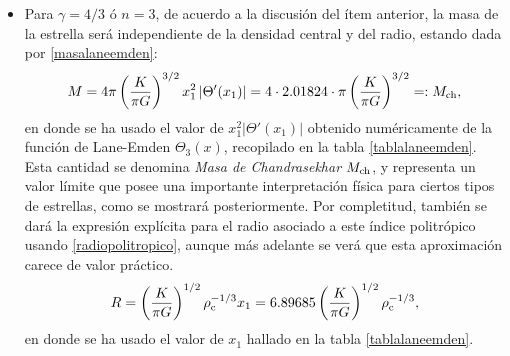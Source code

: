 \begin{itemize}
 \item Para $\gamma=4/3$ ó $n=3$, de acuerdo a la discusión del ítem anterior, la masa de la estrella será independiente de la densidad central y del radio, estando dada por \eqref{masalaneemden}:
\begin{align}\label{masa4/3}
 M=4\pi\left(\frac{K}{\pi G}\right)^{3/2}x_1^2\left|\Theta'(x_1)\right|
 =4\cdot2.01824\cdot\pi\left(\frac{K}{\pi G}\right)^{3/2}=:M_{\rm ch},
\end{align}
en donde se ha usado el valor de $x_1^2\left|\Theta'(x_1)\right|$ obtenido numéricamente de la función de Lane-Emden $\Theta_3(x)$, recopilado en la tabla \ref{tablalaneemden}. Esta cantidad se denomina \emph{Masa de Chandrasekhar} $M_{\rm ch}$, y representa un valor límite que posee una importante interpretación física para ciertos tipos de estrellas, como se mostrará posteriormente.
 Por completitud, también se dará la expresión explícita para el radio asociado a este índice politrópico usando \eqref{radiopolitropico}, aunque más adelante se verá que esta aproximación carece de valor práctico.
\begin{align}\label{radio4/3}
 R=\left(\frac{K}{\pi G}\right)^{1/2}\rho_{\rm c}^{-1/3}x_1
 =6.89685\left(\frac{K}{\pi G}\right)^{1/2}\rho_{\rm c}^{-1/3},
\end{align}
en donde se ha usado el valor de $x_1$ hallado en la tabla \ref{tablalaneemden}.


\end{itemize}
